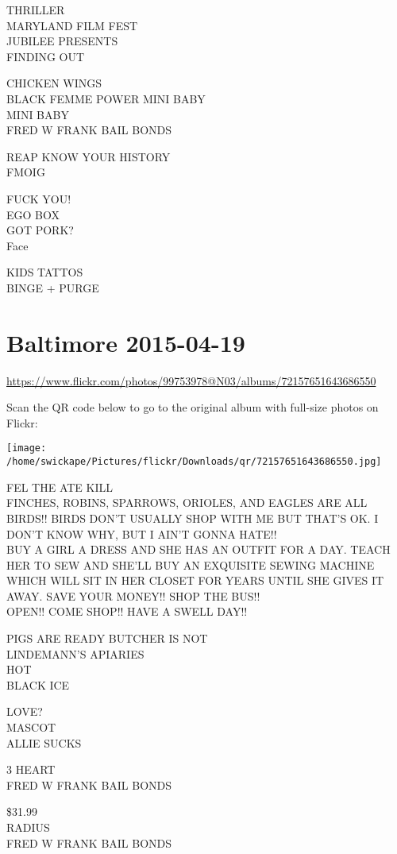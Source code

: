 \documentclass[10pt,letterpaper]{article}
\begin{document}
THRILLER\\
MARYLAND FILM FEST\\
JUBILEE PRESENTS\\
FINDING OUT

CHICKEN WINGS\\
BLACK FEMME POWER MINI BABY\\
MINI BABY\\
FRED W FRANK BAIL BONDS

REAP KNOW YOUR HISTORY\\
FMOIG

FUCK YOU!\\
EGO BOX\\
GOT PORK?\\
Face

KIDS TATTOS\\
BINGE + PURGE


\section*{Baltimore 2015-04-19}

\url{https://www.flickr.com/photos/99753978@N03/albums/72157651643686550}

Scan the QR code below to go to the original album with full-size photos on Flickr:

\texttt{[image: /home/swickape/Pictures/flickr/Downloads/qr/72157651643686550.jpg]}


FEL THE ATE KILL\\
FINCHES, ROBINS, SPARROWS, ORIOLES, AND EAGLES ARE ALL BIRDS!!  BIRDS DON'T USUALLY SHOP WITH ME BUT THAT'S OK.  I DON'T KNOW WHY, BUT I AIN'T GONNA HATE!!\\
BUY A GIRL A DRESS AND SHE HAS AN OUTFIT FOR A DAY.  TEACH HER TO SEW AND SHE'LL BUY AN EXQUISITE SEWING MACHINE WHICH WILL SIT IN HER CLOSET FOR YEARS UNTIL SHE GIVES IT AWAY.  SAVE YOUR MONEY!! SHOP THE BUS!!\\
OPEN!! COME SHOP!! HAVE A SWELL DAY!!

PIGS ARE READY BUTCHER IS NOT\\
LINDEMANN'S APIARIES\\
HOT\\
BLACK ICE

LOVE?\\
MASCOT\\
ALLIE SUCKS

3 HEART\\
FRED W FRANK BAIL BONDS

\$31.99\\
RADIUS\\
FRED W FRANK BAIL BONDS
\end{document}

